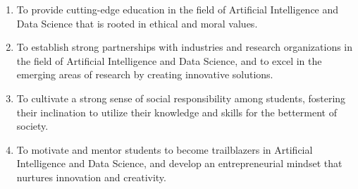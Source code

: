\vspace{0.05cm}
\noindent
\fontsize{10pt}{24pt}\selectfont
\begin{enumerate}
    \item To provide cutting-edge education in the field of Artificial Intelligence and Data Science that is rooted in ethical and moral values.
    \item To establish strong partnerships with industries and research organizations in the field of Artificial Intelligence and Data Science, and to excel in the emerging areas of research by creating innovative solutions.
    \item To cultivate a strong sense of social responsibility among students, fostering their inclination to utilize their knowledge and skills for the betterment of society.
    \item To motivate and mentor students to become trailblazers in Artificial Intelligence and Data Science, and develop an entrepreneurial mindset that nurtures innovation and creativity.
\end{enumerate}



\newpage
